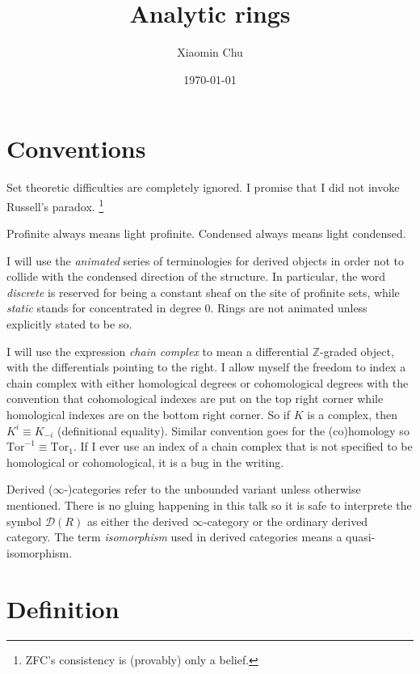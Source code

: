 \documentclass{article}
\title{Analytic rings}
\author{Xiaomin Chu}
\date{\today}
\theoremstyle{plain}
\theoremstyle{definition}
\theoremstyle{remark}
\newcommand{\D}{\mathcal{D}}
\newcommand{\bullshit}[1]{\footnote{#1}}
\begin{document}
\maketitle
\tableofcontents
\pagebreak

\section*{Conventions}

Set theoretic difficulties are completely ignored.
I promise that I did not invoke Russell's paradox.
\bullshit{ZFC's consistency is (provably) only a belief.}

Profinite always means light profinite. Condensed always means light condensed.

I will use the \emph{animated} series of terminologies for derived objects in order not to collide with the condensed direction of the structure.
In particular,
the word \emph{discrete} is reserved for being a constant sheaf on the site of profinite sets, while
\emph{static} stands for concentrated in degree $ 0 $.
Rings are not animated unless explicitly stated to be so.

I will use the expression \emph{chain complex} to mean a differential $ \mathbb{Z} $-graded object, with
the differentials pointing to the right.
I allow myself the freedom to index a chain complex with either homological degrees or cohomological degrees with the convention that
cohomological indexes are put on the top right corner while homological indexes are on the bottom right corner.
So if $ K $ is a complex, then $ K ^{i} \equiv K _{-i} $ (definitional equality).
Similar convention goes for the (co)homology so $ \mathrm{Tor}^{-1}\equiv \mathrm{Tor}_{1} $.
If I ever use an index of a chain complex that is not specified to be homological or cohomological, it is a bug in the writing.

Derived ($ \infty $-)categories refer to the unbounded variant unless otherwise mentioned.
There is no gluing happening in this talk so it is safe to interprete the symbol $ \D(R) $ as either the derived $ \infty $-category
or the ordinary derived category.
The term \emph{isomorphism} used in derived categories means a quasi-isomorphism.

\pagebreak

\section{Definition}
\end{document}
